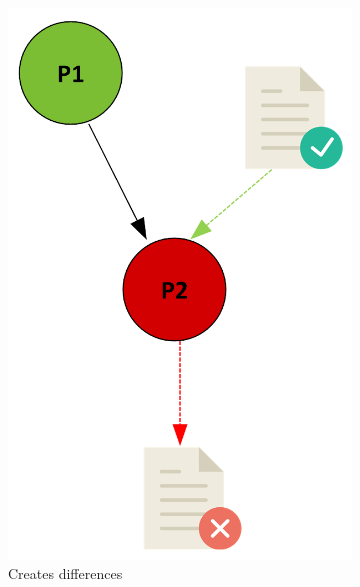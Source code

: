 \documentclass[a4paper,num-refs]{oup-contemporary}
\begin{document}
\begin{figure}
\begin{subfigure}{0.2\linewidth}
    \includegraphics[scale=0.3]{images/red.png}
    \caption{Creates differences}
    \label{fig:red}
    \end{subfigure}
    \hfill
    \begin{subfigure}{0.2\linewidth}

\end{subfigure}
\end{figure}
\end{document}
